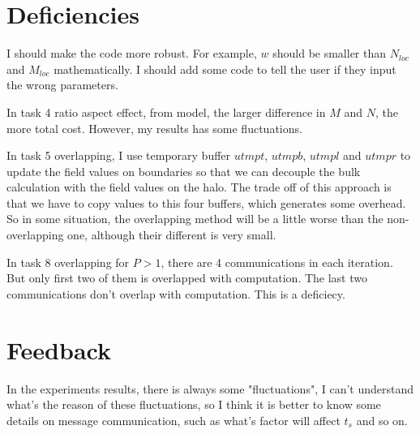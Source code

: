 
\section{Deficiencies}
I should make the code more robust. For example, $w$ should be smaller than $N_{loc}$
and $M_{loc}$ mathematically. I should add some code to tell the user if they 
input the wrong parameters.

In task 4 ratio aspect effect, from model, the larger difference in $M$ and $N$,
the more total cost. However, my results has some fluctuations.

In task 5 overlapping, I use temporary buffer $utmpt$, $utmpb$, $utmpl$ and $utmpr$
to update the field values on boundaries so that we can decouple the bulk calculation
with the field values on the halo. The trade off of this approach is that we have to
copy values to this four buffers, which generates some overhead. So in some situation,
the overlapping method will be a little worse than  the non-overlapping one, although
their different is very small.

In task 8 overlapping for $P>1$, there are 4 communications in each iteration. But
only first two of them is overlapped with computation. The last two communications
don't overlap with computation. This is a deficiecy.

\section{Feedback}
In the experiments results, there is always some "fluctuations", I can't understand
what's the reason of these fluctuations, so I think it is better to know some details
on message communication, such as what's factor will affect $t_s$ and so on.

